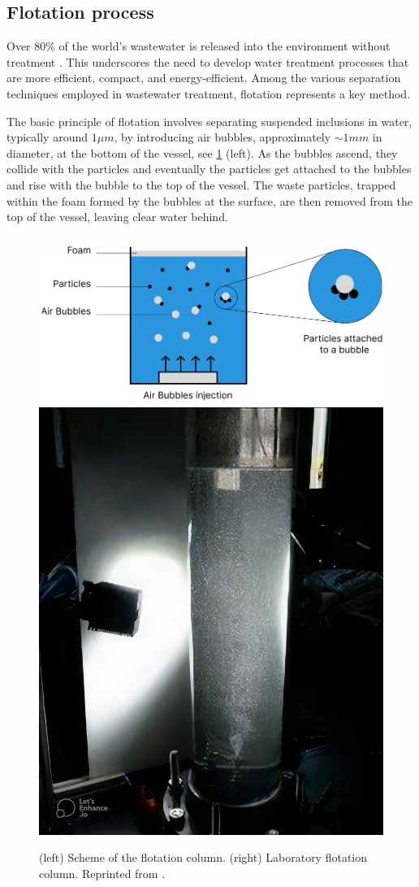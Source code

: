 \subsection{Flotation process}

Over 80\% of the world’s wastewater is released into the environment without treatment \citep{ryder2017rapport}. 
This underscores the need to develop water treatment processes that are more efficient, compact, and energy-efficient. 
Among the various separation techniques employed in wastewater treatment, flotation represents a key method. 

The basic principle of flotation involves separating suspended inclusions in water, typically around $1\mu m$, by introducing air bubbles, approximately $\sim 1 mm$ in diameter, at the bottom of the vessel, see \ref{fig:flo} (left).   
As the bubbles ascend, they collide with the particles and eventually the particles get attached to the bubbles and rise with the bubble to the top of the vessel.
The waste particles, trapped within the foam formed by the bubbles at the surface, are then removed from the top of the vessel, leaving clear water behind.  
\begin{figure}[h!]
    \centering
    \includegraphics[height=0.3\textwidth]{image/flo_scheme.png}
    \includegraphics[height=0.3\textwidth]{image/flo_LE_auto_x4.jpg}
    \caption{
        (left) Scheme of the flotation column. 
        (right) Laboratory flotation column. 
        Reprinted from \citet{landal2025}.
        }
        \label{fig:flo}
\end{figure}


